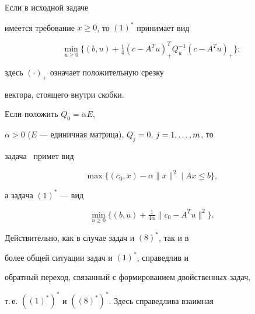 \begin{note} Если в исходной задаче 


имеется требование $x\ge 0$, то $(1)^*$ принимает вид


\begin{equation}


\label{f7}


\min_{u\ge 0} \{(b, u) +\tfrac{1}{4} (c-A^Tu)_+^T 


Q_u^{-1} (c-A^Tu)_+ \};


\end{equation}


здесь $(\cdot)_+$ означает положительную срезку


вектора, стоящего внутри скобки.


\end{note}





\begin{note} Если положить $Q_0=\alpha E$,


$\alpha>0$ ($E$ --- единичная матрица), $Q_j=0$, $j=1,\dotsc,m$, то


задача~ примет вид


\begin{equation}


\label{f8}


\max \{ (c_0, x) -\alpha \| x\|^2 \mid Ax\leq b \},


\end{equation}


а задача $(1)^*$ --- вид


\begin{equation}


\min_{u\geq 0} \{(b, u) + \tfrac{ 1}{4\alpha} \|


c_0-A^Tu \|^2 \}.\tag*{$(8)^*$}


\end{equation}


\end{note}





Действительно, как в случае задач  и $(8)^*$, так и в


более общей ситуации задач  и $(1)^*$, справедлив и


обратный переход, связанный с формированием двойственных задач,


т.\,е.{} $((1)^*)^*$ и $((8)^*)^*$. Здесь справедлива взаимная


